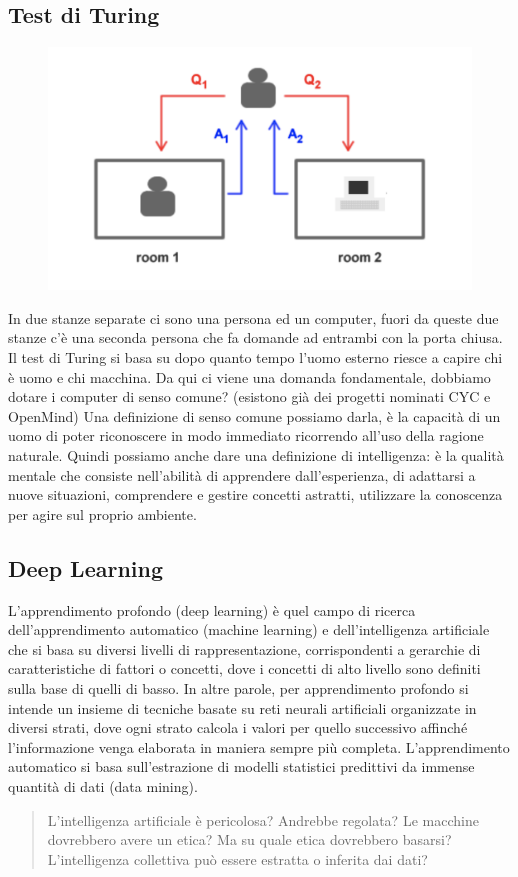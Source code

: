 \documentclass{article}
\begin{document}
\subsection{Test di Turing}
\begin{figure}[H]
    \centering
    \includegraphics[scale=0.4]{Images/testdituring.png}
\end{figure}
In due stanze separate ci sono una persona ed un computer, fuori da queste due stanze c'è una seconda persona che fa domande ad entrambi con la porta chiusa. Il test di Turing si basa su dopo quanto tempo l'uomo esterno riesce a capire chi è uomo e chi macchina. \newline
Da qui ci viene una domanda fondamentale, dobbiamo dotare i computer di senso comune? (esistono già dei progetti nominati CYC e OpenMind) Una definizione di senso comune possiamo darla, è la capacità di un uomo di poter riconoscere in modo immediato ricorrendo all'uso della ragione naturale. Quindi possiamo anche dare una definizione di intelligenza: è la qualità mentale che consiste nell'abilità di apprendere dall'esperienza, di adattarsi a nuove situazioni, comprendere e gestire concetti astratti, utilizzare la conoscenza per agire sul proprio ambiente.

\subsection{Deep Learning}
L'apprendimento profondo (deep learning) è quel campo di ricerca dell'apprendimento automatico (machine learning) e dell'intelligenza artificiale che si basa su diversi livelli di rappresentazione, corrispondenti a gerarchie di caratteristiche di fattori o concetti, dove i concetti di alto livello sono definiti sulla base di quelli di basso. In altre parole, per apprendimento profondo si intende un insieme di tecniche basate su reti neurali artificiali organizzate in diversi strati, dove ogni strato calcola i valori per quello successivo affinché l'informazione venga elaborata in maniera sempre più completa. L'apprendimento automatico si basa sull'estrazione di modelli statistici predittivi da immense quantità di dati (data mining).
\begin{quote}
    L'intelligenza artificiale è pericolosa? Andrebbe regolata? Le macchine dovrebbero avere un etica? Ma su quale etica dovrebbero basarsi? L'intelligenza collettiva può essere estratta o inferita dai dati?
\end{quote}
\end{document}
